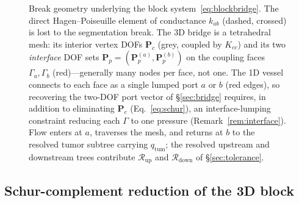 \documentclass[11pt]{article}
\newcommand{\Rup}{\mathcal{R}_{\mathrm{up}}}
\newcommand{\Rdown}{\mathcal{R}_{\mathrm{down}}}
\newcommand{\qtum}{q_{\mathrm{tum}}}
\begin{document}
\begin{figure}[t]
\begin{tikzpicture}
\end{tikzpicture}
\caption{Break geometry underlying the block system~\eqref{eq:blockbridge}. The
direct Hagen--Poiseuille element of conductance $k_{ab}$ (dashed, crossed) is lost to
the segmentation break. The 3D bridge is a tetrahedral mesh: its interior vertex DOFs
$\bm{P}_c$ (grey, coupled by $K_{cc}$) and its two \emph{interface} DOF sets
$\bm{P}_p=(\bm{P}_p^{(a)},\bm{P}_p^{(b)})$ on the coupling faces $\Gamma_a,\Gamma_b$
(red)---generally many nodes per face, not one. The 1D vessel connects to each face
as a single lumped port $a$ or $b$ (red edges), so recovering the two-DOF port vector
of \S\ref{sec:bridge} requires, in addition to eliminating $\bm{P}_c$
(Eq.~\eqref{eq:schur}), an interface-lumping constraint reducing each $\Gamma$ to one
pressure (Remark~\ref{rem:interface}). Flow enters at $a$, traverses the mesh, and
returns at $b$ to the resolved tumor subtree carrying $\qtum$; the resolved upstream
and downstream trees contribute $\Rup$ and $\Rdown$ of \S\ref{sec:tolerance}.}
\label{fig:break}
\end{figure}

\subsection{Schur-complement reduction of the 3D block}
\end{document}
